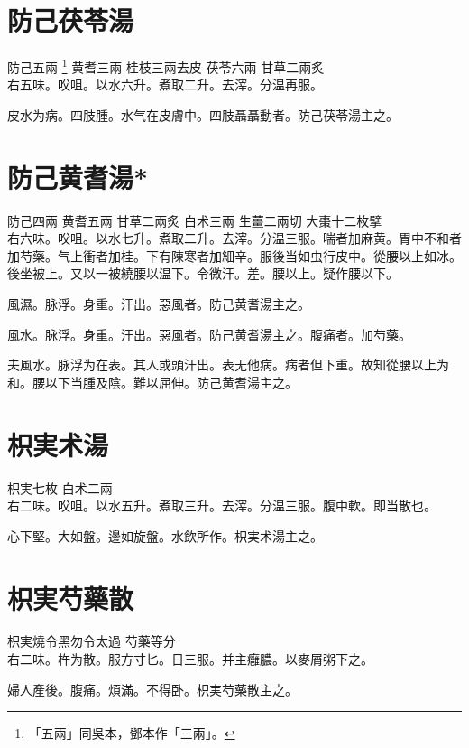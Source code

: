 \section{防己茯苓湯}

防己{\scriptsize 五兩
	\footnote{
		「五兩」同吳本，鄧本作「三兩」。
	}
} 黄耆{\scriptsize 三兩} 桂枝{\scriptsize 三兩去皮} 茯苓{\scriptsize 六兩} 甘草{\scriptsize 二兩炙}\\
右五味。㕮咀。以水六升。煮取二升。去滓。分温再服。

皮水为病。四肢腫。水气在皮膚中。四肢聶聶動者。防己茯苓湯主之。

\section{防己黄耆湯*}

防己{\scriptsize 四兩} 黄耆{\scriptsize 五兩} 甘草{\scriptsize 二兩炙} 白术{\scriptsize 三兩} 生薑{\scriptsize 二兩切} 大棗{\scriptsize 十二枚擘}\\
右六味。㕮咀。以水七升。煮取二升。去滓。分温三服。喘者加麻黄。胃中不和者加芍藥。气上衝者加桂。下有陳寒者加細辛。服後当如虫行皮中。從腰以上如冰。後坐被上。又以一被繞腰以温下。令微汗。差。{\scriptsize 腰以上。疑作腰以下。}{\wuben}

風濕。脉浮。身重。汗出。惡風者。防己黄耆湯主之。

風水。脉浮。身重。汗出。惡風者。防己黄耆湯主之。腹痛者。加芍藥。

夫風水。脉浮为在表。其人或頭汗出。表无他病。病者但下重。故知從腰以上为和。腰以下当腫及陰。難以屈伸。防己黄耆湯主之。

\section{枳実术湯}

枳実{\scriptsize 七枚} 白术{\scriptsize 二兩}\\
右二味。㕮咀。以水五升。煮取三升。去滓。分温三服。腹中軟。即当散也。

心下堅。大如盤。邊如旋盤。水飲所作。枳実术湯主之。

\section{枳実芍藥散}

枳実{\scriptsize 燒令黑勿令太過} 芍藥{\scriptsize 等分}\\
右二味。杵为散。服方寸匕。日三服。并主癰膿。以麥屑粥下之。

婦人產後。腹痛。煩滿。不得卧。枳実芍藥散主之。

